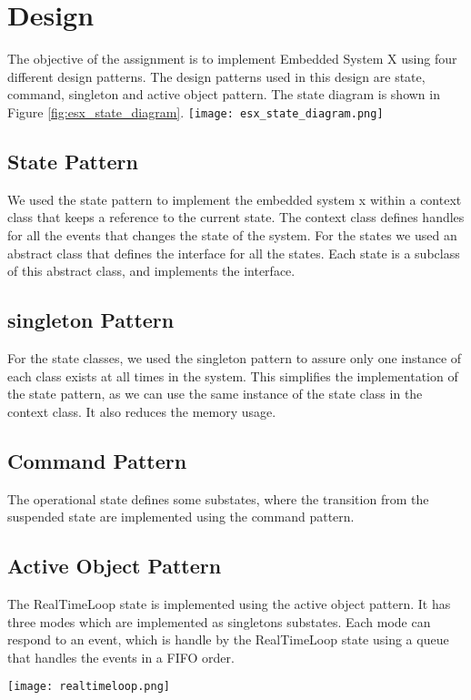\documentclass[../main.tex]{subfiles}
\begin{document}
\section{Design}

The objective of the assignment is to implement Embedded System X using four different design patterns. The design patterns used in this design are state, command, singleton and active object pattern. 
The state diagram is shown in Figure \ref{fig:esx_state_diagram}.
\texttt{[image: esx\_state\_diagram.png]}

\subsection{State Pattern}
We used the state pattern to implement the embedded system x within a context class that keeps a reference to the current state.
The context class defines handles for all the events that changes the state of the system. 
For the states we used an abstract class that defines the interface for all the states. Each state is a subclass of this abstract class, and implements the interface.

\subsection{singleton Pattern}
For the state classes, we used the singleton pattern to assure only one instance of each class exists at all times in the system. This simplifies the implementation of the state pattern, 
as we can use the same instance of the state class in the context class. It also reduces the memory usage. 

\subsection{Command Pattern}
The operational state defines some substates, where the transition from the suspended state are implemented using the command pattern. 

\subsection{Active Object Pattern}
The RealTimeLoop state is implemented using the active object pattern. It has three modes which are implemented as singletons substates. 
Each mode can respond to an event, which is handle by the RealTimeLoop state using a queue that handles the events in a FIFO order.

\texttt{[image: realtimeloop.png]}
\end{document}
